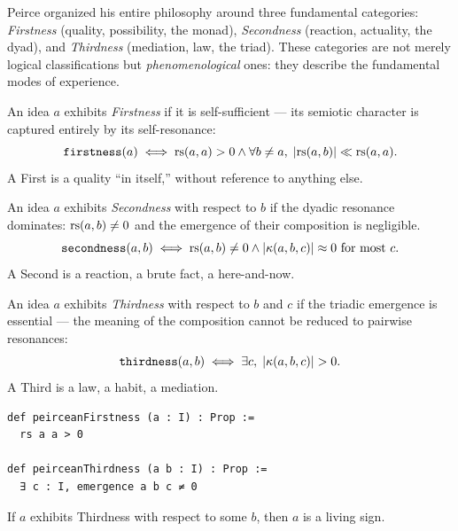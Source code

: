 Peirce organized his entire philosophy around three fundamental
categories: \emph{Firstness} (quality, possibility, the monad),
\emph{Secondness} (reaction, actuality, the dyad), and
\emph{Thirdness} (mediation, law, the triad). These categories are
not merely logical classifications but \emph{phenomenological}
ones: they describe the fundamental modes of experience.

\begin{definition}
\label{def:firstness}
An idea $a$ exhibits \emph{Firstness} if it is self-sufficient ---
its semiotic character is captured entirely by its self-resonance:
\[
  \texttt{firstness}(a) \iff \mathrm{rs}(a, a) > 0 \wedge
  \forall b \neq a,\; |\mathrm{rs}(a, b)| \ll \mathrm{rs}(a, a).
\]
A First is a quality ``in itself,'' without reference to anything else.
\end{definition}

\begin{definition}
\label{def:secondness}
An idea $a$ exhibits \emph{Secondness} with respect to $b$ if the
dyadic resonance dominates: $\mathrm{rs}(a, b) \neq 0$ and the emergence
of their composition is negligible.
\[
  \texttt{secondness}(a, b) \iff \mathrm{rs}(a, b) \neq 0 \wedge
  |\kappa(a, b, c)| \approx 0 \text{ for most } c.
\]
A Second is a reaction, a brute fact, a here-and-now.
\end{definition}

\begin{definition}
\label{def:thirdness}
An idea $a$ exhibits \emph{Thirdness} with respect to $b$ and $c$
if the triadic emergence is essential --- the meaning of the
composition cannot be reduced to pairwise resonances:
\[
  \texttt{thirdness}(a, b) \iff
  \exists c,\; |\kappa(a, b, c)| > 0.
\]
A Third is a law, a habit, a mediation.
\end{definition}

\begin{lstlisting}[caption={Peirce's categories as resonance modes}]
def peirceanFirstness (a : I) : Prop :=
  rs a a > 0

def peirceanThirdness (a b : I) : Prop :=
  ∃ c : I, emergence a b c ≠ 0
\end{lstlisting}

\begin{theorem}
\label{thm:thirdness-living}
If $a$ exhibits Thirdness with respect to some $b$, then $a$ is a
living sign.
\end{theorem}

